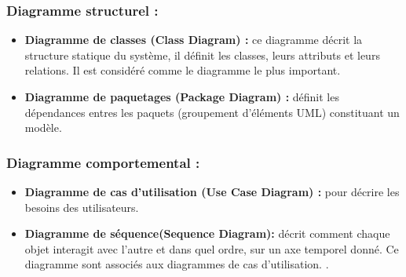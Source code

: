  \subsubsection{Diagramme structurel : }
 \begin{itemize}
 \item \textbf{Diagramme de classes (Class Diagram) : }ce diagramme décrit la structure statique du système, il définit les classes, leurs attributs et leurs relations. Il est considéré comme le diagramme le plus important.
  \item  \textbf{Diagramme de paquetages (Package Diagram) : }définit les dépendances entres les paquets (groupement d’éléments UML) constituant un modèle. 
 \end{itemize}
 
 
  \subsubsection{Diagramme comportemental  : }
 
  \begin{itemize}
 	\item \textbf{Diagramme de cas d’utilisation (Use Case Diagram) : } pour décrire les besoins des utilisateurs. 
 	\item  \textbf{Diagramme de séquence(Sequence Diagram):}  décrit comment chaque objet interagit avec l’autre et dans quel ordre, sur un axe temporel donné. Ce diagramme sont associés aux diagrammes de cas d’utilisation.
 	. 
 \end{itemize}



